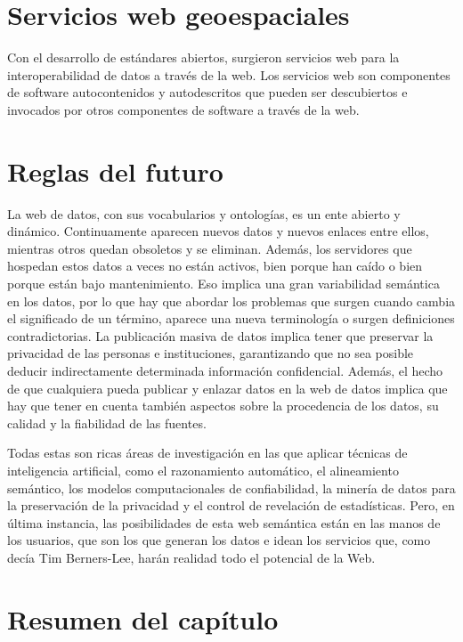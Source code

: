 \section{Servicios web geoespaciales}

Con el desarrollo de estándares abiertos, surgieron servicios web para la interoperabilidad de datos a través de la web. Los servicios web son componentes de software autocontenidos y autodescritos que pueden ser descubiertos e invocados por otros componentes de software a través de la web.



\section{Reglas del futuro}


La web de datos, con sus vocabularios y ontologías, es un ente abierto y dinámico. Continuamente aparecen nuevos datos y nuevos enlaces entre ellos, mientras otros quedan obsoletos y se eliminan. Además, los servidores que hospedan estos datos a veces no están activos, bien porque han caído o bien porque están bajo mantenimiento. Eso implica una gran variabilidad semántica en los datos, por lo que hay que abordar los problemas que surgen cuando cambia el significado de un término, aparece una nueva terminología o surgen definiciones contradictorias. La publicación masiva de datos implica tener que preservar la privacidad de las personas e instituciones, garantizando que no sea posible deducir indirectamente determinada información confidencial. Además, el hecho de que cualquiera pueda publicar y enlazar datos en la web de datos implica que hay que tener en cuenta también aspectos sobre la procedencia de los datos, su calidad y la fiabilidad de las fuentes.

Todas estas son ricas áreas de investigación en las que aplicar técnicas de inteligencia artificial, como el razonamiento automático, el alineamiento semántico, los modelos computacionales de confiabilidad, la minería de datos para la preservación de la privacidad y el control de revelación de estadísticas. Pero, en última instancia, las posibilidades de esta web semántica están en las manos de los usuarios, que son los que generan los datos e idean los servicios que, como decía Tim Berners-Lee, harán realidad todo el potencial de la Web.

\section{Resumen del capítulo}

